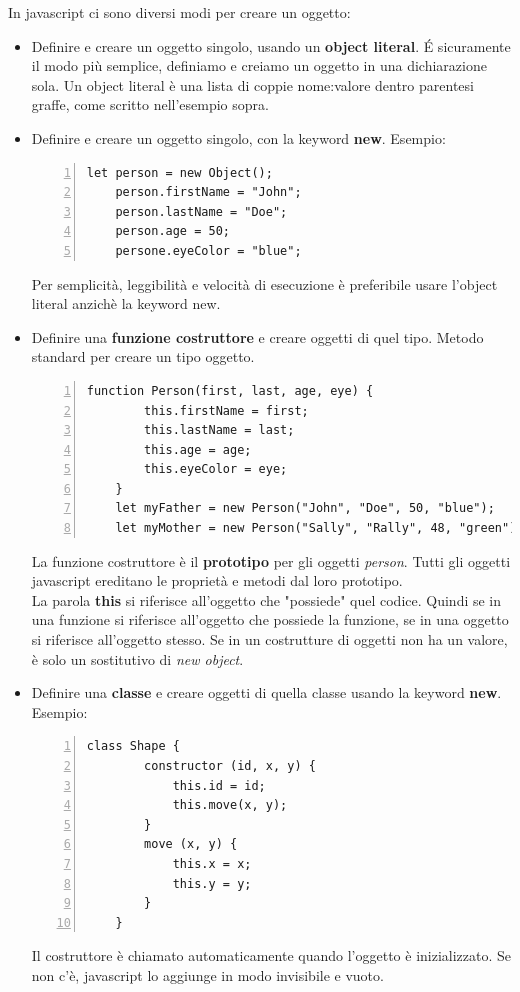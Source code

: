 In javascript ci sono diversi modi per creare un oggetto:
\begin{itemize}
    \item Definire e creare un oggetto singolo, usando un \textbf{object literal}. \'E sicuramente il modo più semplice, definiamo e creiamo un oggetto in una dichiarazione sola. Un object literal è una lista di coppie nome:valore dentro parentesi graffe, come scritto nell'esempio sopra.
    \item Definire e creare un oggetto singolo, con la keyword \textbf{new}. Esempio:
    \begin{Verbatim}[numbers = left, frame=single]
    let person = new Object();
    person.firstName = "John";
    person.lastName = "Doe";
    person.age = 50;
    persone.eyeColor = "blue";
    \end{Verbatim}
    Per semplicità, leggibilità e velocità di esecuzione è preferibile usare l'object literal anzichè la keyword new.
    \item Definire una \textbf{funzione costruttore} e creare oggetti di quel tipo. Metodo standard per creare un tipo oggetto. 
    \begin{Verbatim}[numbers = left, frame=single]
    function Person(first, last, age, eye) {
        this.firstName = first;
        this.lastName = last;
        this.age = age;
        this.eyeColor = eye;
    }
    let myFather = new Person("John", "Doe", 50, "blue");
    let myMother = new Person("Sally", "Rally", 48, "green");
    \end{Verbatim}
    La funzione costruttore è il \textbf{prototipo} per gli oggetti \emph{person}. Tutti gli oggetti javascript ereditano le proprietà e metodi dal loro prototipo. \\
    
    La parola \textbf{this} si riferisce all'oggetto che "possiede" quel codice. Quindi se in una funzione si riferisce all'oggetto che possiede la funzione, se in una oggetto si riferisce all'oggetto stesso. Se in un costrutture di oggetti non ha un valore, è solo un sostitutivo di \emph{new object}. 
    \item Definire una \textbf{classe} e creare oggetti di quella classe usando la keyword \textbf{new}. Esempio:
    \begin{Verbatim}[numbers = left, frame=single]
    class Shape {
        constructor (id, x, y) {
            this.id = id;
            this.move(x, y);
        }
        move (x, y) {
            this.x = x;
            this.y = y;
        }
    }
    \end{Verbatim}
    Il costruttore è chiamato automaticamente quando l'oggetto è inizializzato. Se non c'è, javascript lo aggiunge in modo invisibile e vuoto.
    

\end{itemize}
